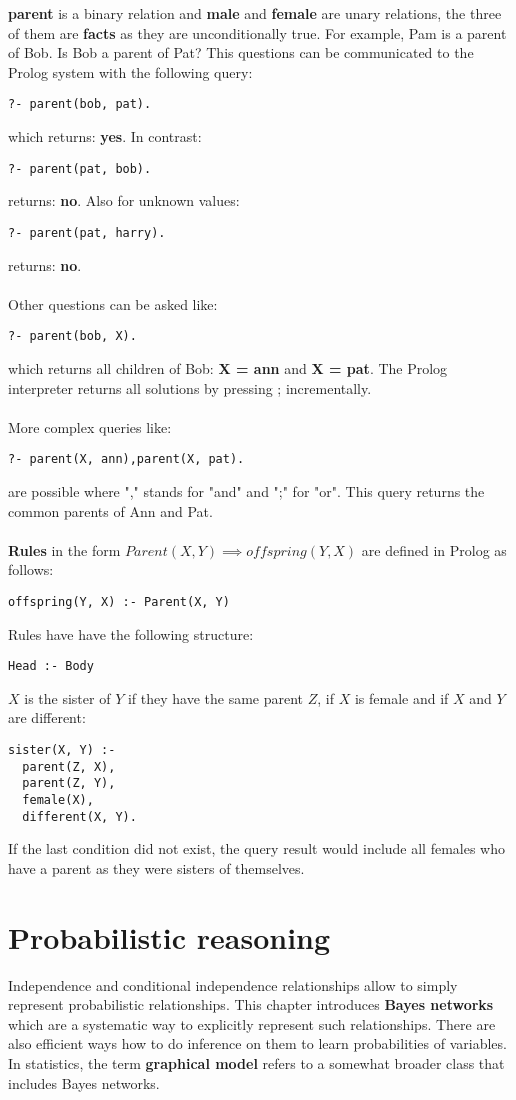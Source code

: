 \documentclass{report}
\begin{document}
{\bf parent} is a binary relation and {\bf male} and {\bf female} are unary relations, the three of them are {\bf facts} as they are unconditionally true. For example, Pam is a parent of Bob.
Is Bob a parent of Pat? This questions can be communicated to the Prolog system with the following query:
\begin{lstlisting}
?- parent(bob, pat).
\end{lstlisting}
which returns: {\bf yes}. In contrast:
\begin{lstlisting}
?- parent(pat, bob).
\end{lstlisting}
returns: {\bf no}. Also for unknown values:
\begin{lstlisting}
?- parent(pat, harry).
\end{lstlisting}
returns: {\bf no}.
\\
\\
Other questions can be asked like:
\begin{lstlisting}
?- parent(bob, X).
\end{lstlisting}
which returns all children of Bob: {\bf X = ann} and {\bf X = pat}. The Prolog interpreter returns all solutions by pressing ; incrementally.
\\
\\
More complex queries like:
\begin{lstlisting}
?- parent(X, ann),parent(X, pat).
\end{lstlisting}
are possible where "," stands for "and" and ";" for "or". This query returns the common parents of Ann and Pat.
\\
\\
{\bf  Rules} in the form $Parent(X, Y) \implies offspring(Y, X)$ are defined in Prolog as follows:
\begin{lstlisting}
offspring(Y, X) :- Parent(X, Y)
\end{lstlisting}
Rules have have the following structure:
\begin{lstlisting}
Head :- Body
\end{lstlisting}
$X$ is the sister of $Y$ if they have the same parent $Z$, if $X$ is female and if $X$ and $Y$ are different:
\begin{lstlisting}
sister(X, Y) :-
  parent(Z, X),
  parent(Z, Y),
  female(X),
  different(X, Y).
\end{lstlisting}
If the last condition did not exist, the query result would include all females who have a parent as they were sisters of themselves.

\chapter{Probabilistic reasoning}
Independence and conditional independence relationships allow to simply represent probabilistic relationships.
This chapter introduces {\bf Bayes networks} which are a systematic way to explicitly represent such relationships.
There are also efficient ways how to do inference on them to learn probabilities of variables.
In statistics, the term {\bf graphical model} refers to a somewhat broader class that includes Bayes networks.
\end{document}
